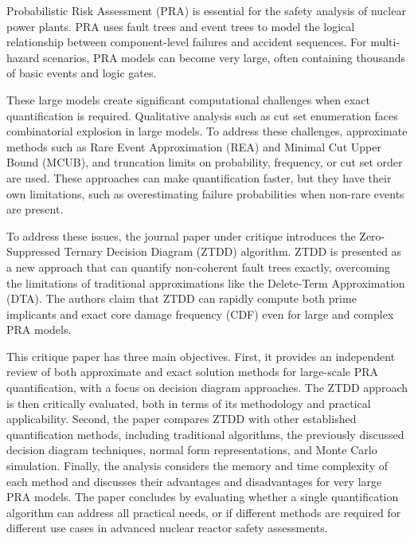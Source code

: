 Probabilistic Risk Assessment (PRA) is essential for the safety analysis of nuclear power plants. PRA uses fault trees and event trees to model the logical relationship between component-level failures and accident sequences. For multi-hazard scenarios, PRA models can become very large, often containing thousands of basic events and logic gates.

These large models create significant computational challenges when exact quantification is required. Qualitative analysis such as cut set enumeration faces combinatorial explosion in large models. To address these challenges, approximate methods such as Rare Event Approximation (REA) and Minimal Cut Upper Bound (MCUB), and truncation limits on probability, frequency, or cut set order are used. These approaches can make quantification faster, but they have their own limitations, such as overestimating failure probabilities when non-rare events are present.

To address these issues, the journal paper under critique introduces the Zero-Suppressed Ternary Decision Diagram (ZTDD) algorithm. ZTDD is presented as a new approach that can quantify non-coherent fault trees exactly, overcoming the limitations of traditional approximations like the Delete-Term Approximation (DTA). The authors claim that ZTDD can rapidly compute both prime implicants and exact core damage frequency (CDF) even for large and complex PRA models.

This critique paper has three main objectives. First, it provides an independent review of both approximate and exact solution methods for large-scale PRA quantification, with a focus on decision diagram approaches. The ZTDD approach is then critically evaluated, both in terms of its methodology and practical applicability. Second, the paper compares ZTDD with other established quantification methods, including traditional algorithms, the previously discussed decision diagram techniques, normal form representations, and Monte Carlo simulation. Finally, the analysis considers the memory and time complexity of each method and discusses their advantages and disadvantages for very large PRA models. The paper concludes by evaluating whether a single quantification algorithm can address all practical needs, or if different methods are required for different use cases in advanced nuclear reactor safety assessments.